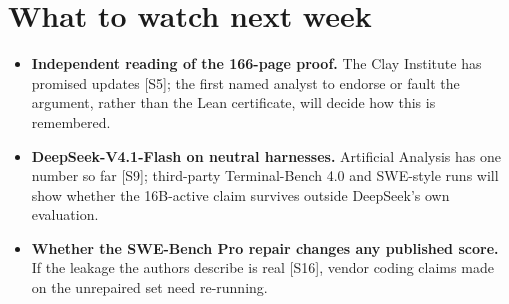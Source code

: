 \documentclass[11pt,a4paper]{article}
\newcommand{\srcref}[1]{\textcolor{brandaccent}{[S#1]}}
\begin{document}
\section{What to watch next week}
\begin{itemize}
  \item \textbf{Independent reading of the 166-page proof.} The Clay Institute has
        promised updates \srcref{5}; the first named analyst to endorse or fault the
        argument, rather than the Lean certificate, will decide how this is remembered.
  \item \textbf{DeepSeek-V4.1-Flash on neutral harnesses.} Artificial Analysis has one
        number so far \srcref{9}; third-party Terminal-Bench 4.0 and SWE-style runs will
        show whether the 16B-active claim survives outside DeepSeek's own evaluation.
  \item \textbf{Whether the SWE-Bench Pro repair changes any published score.} If the
        leakage the authors describe is real \srcref{16}, vendor coding claims made on the
        unrepaired set need re-running.
\end{itemize}

\end{document}
